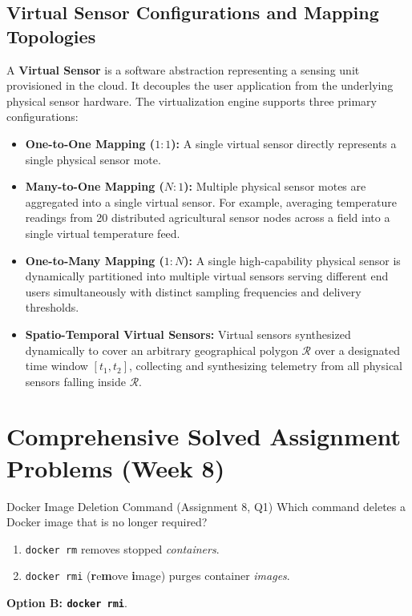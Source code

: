 \subsection{Virtual Sensor Configurations and Mapping Topologies}
A \textbf{Virtual Sensor} is a software abstraction representing a sensing unit provisioned in the cloud. It decouples the user application from the underlying physical sensor hardware. The virtualization engine supports three primary configurations:

\begin{itemize}[leftmargin=*]
  \item \textbf{One-to-One Mapping ($1:1$):} A single virtual sensor directly represents a single physical sensor mote.
  \item \textbf{Many-to-One Mapping ($N:1$):} Multiple physical sensor motes are aggregated into a single virtual sensor. For example, averaging temperature readings from 20 distributed agricultural sensor nodes across a field into a single virtual temperature feed.
  \item \textbf{One-to-Many Mapping ($1:N$):} A single high-capability physical sensor is dynamically partitioned into multiple virtual sensors serving different end users simultaneously with distinct sampling frequencies and delivery thresholds.
  \item \textbf{Spatio-Temporal Virtual Sensors:} Virtual sensors synthesized dynamically to cover an arbitrary geographical polygon $\mathcal{R}$ over a designated time window $[t_1, t_2]$, collecting and synthesizing telemetry from all physical sensors falling inside $\mathcal{R}$.
\end{itemize}

\section{Comprehensive Solved Assignment Problems (Week 8)}

\begin{solved}{Docker Image Deletion Command (Assignment 8, Q1)}
\Given Which command deletes a Docker image that is no longer required?
\Steps
\begin{enumerate}[leftmargin=*]
  \item \texttt{docker rm} removes stopped \emph{containers}.
  \item \texttt{docker rmi} (\textbf{r}e\textbf{m}ove \textbf{i}mage) purges container \emph{images}.
\end{enumerate}
\Answer \textbf{Option B: \texttt{docker rmi}}.
\end{solved}

